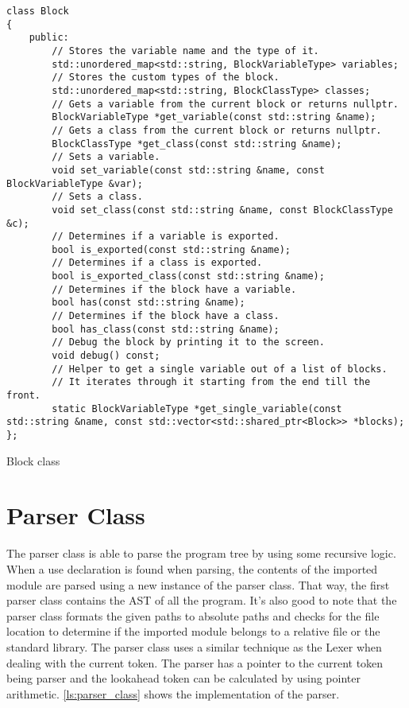 \begin{listing}[H]
\begin{verbatim}
class Block
{
    public:
        // Stores the variable name and the type of it.
        std::unordered_map<std::string, BlockVariableType> variables;
        // Stores the custom types of the block.
        std::unordered_map<std::string, BlockClassType> classes;
        // Gets a variable from the current block or returns nullptr.
        BlockVariableType *get_variable(const std::string &name);
        // Gets a class from the current block or returns nullptr.
        BlockClassType *get_class(const std::string &name);
        // Sets a variable.
        void set_variable(const std::string &name, const BlockVariableType &var);
        // Sets a class.
        void set_class(const std::string &name, const BlockClassType &c);
        // Determines if a variable is exported.
        bool is_exported(const std::string &name);
        // Determines if a class is exported.
        bool is_exported_class(const std::string &name);
        // Determines if the block have a variable.
        bool has(const std::string &name);
        // Determines if the block have a class.
        bool has_class(const std::string &name);
        // Debug the block by printing it to the screen.
        void debug() const;
        // Helper to get a single variable out of a list of blocks.
        // It iterates through it starting from the end till the front.
        static BlockVariableType *get_single_variable(const std::string &name, const std::vector<std::shared_ptr<Block>> *blocks);
};
\end{verbatim}
\caption{Block class}
\label{ls:block_class}
\end{listing}

\section{Parser Class}
\label{sec:parser_class}

The parser class is able to parse the program tree by using some recursive logic. When a use declaration is found when parsing,
the contents of the imported module are parsed using a new instance of the parser class. That way, the first parser class contains
the AST of all the program. It's also good to note that the parser class formats the given paths to absolute paths and checks for the
file location to determine if the imported module belongs to a relative file or the standard library. The parser class uses a similar technique
as the Lexer when dealing with the current token. The parser has a pointer to the current token being parser and the lookahead token can be
calculated by using pointer arithmetic. \autoref{ls:parser_class} shows the implementation of the parser.

